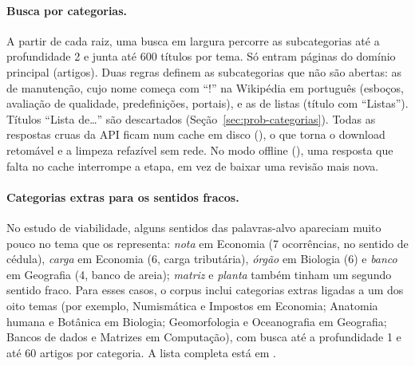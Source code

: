 \paragraph{Busca por categorias.} A partir de cada raiz, uma busca em largura percorre as
subcategorias até a profundidade 2 e junta até 600 títulos por tema. Só entram páginas do
domínio principal (artigos). Duas regras definem as subcategorias que não são abertas: as de
manutenção, cujo nome começa com ``!'' na Wikipédia em português (esboços, avaliação de
qualidade, predefinições, portais), e as de listas (título com ``Listas''). Títulos ``Lista
de\ldots'' são descartados
(Seção~\ref{sec:prob-categorias}). Todas as respostas cruas da API ficam num cache em disco
(), o que torna o download retomável e a limpeza refazível sem rede. No
modo offline (), uma resposta que falta no cache interrompe a
etapa, em vez de baixar uma revisão mais nova.

\paragraph{Categorias extras para os sentidos fracos.} No estudo de viabilidade, alguns
sentidos das palavras-alvo apareciam muito pouco no tema que os representa: \emph{nota} em
Economia (7 ocorrências, no sentido de cédula), \emph{carga} em Economia (6, carga
tributária), \emph{órgão} em Biologia (6) e \emph{banco} em Geografia (4, banco de areia);
\emph{matriz} e \emph{planta} também tinham um segundo sentido fraco. Para esses casos, o
corpus inclui categorias extras ligadas a um dos oito temas (por exemplo, Numismática e Impostos
em Economia; Anatomia humana e Botânica em Biologia; Geomorfologia e Oceanografia em
Geografia; Bancos de dados e Matrizes em Computação), com busca até a profundidade 1 e até 60
artigos por categoria. A lista completa está em .

